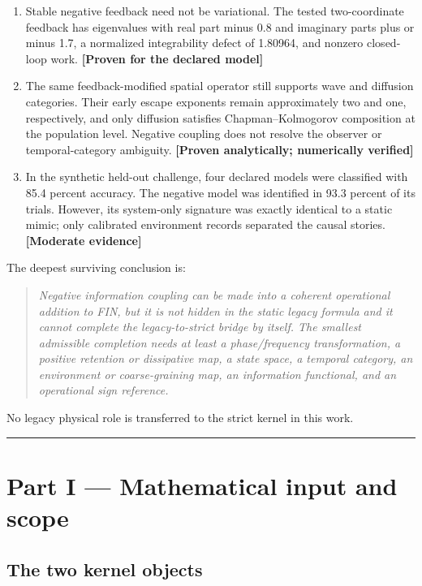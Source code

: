 \documentclass[11pt,a4paper,openany]{report}
\newcommand{\statusModerate}{\textcolor{finviolet}{[Moderate evidence]}}
\begin{document}
\begin{enumerate}
\item 
Stable negative feedback need not be variational. The tested two-coordinate feedback has eigenvalues with real part minus 0.8 and imaginary parts plus or minus 1.7, a normalized integrability defect of 1.80964, and nonzero closed-loop work. \textbf{[Proven for the declared model]}

\item 
The same feedback-modified spatial operator still supports wave and diffusion categories. Their early escape exponents remain approximately two and one, respectively, and only diffusion satisfies Chapman–Kolmogorov composition at the population level. Negative coupling does not resolve the observer or temporal-category ambiguity. \textbf{[Proven analytically; numerically verified]}

\item 
In the synthetic held-out challenge, four declared models were classified with 85.4 percent accuracy. The negative model was identified in 93.3 percent of its trials. However, its system-only signature was exactly identical to a static mimic; only calibrated environment records separated the causal stories. \textbf{\statusModerate{}}

\end{enumerate}

The deepest surviving conclusion is:

\begin{quote}\itshape
Negative information coupling can be made into a coherent operational addition to FIN, but it is not hidden in the static legacy formula and it cannot complete the legacy-to-strict bridge by itself. The smallest admissible completion needs at least a phase/\allowbreak{}frequency transformation, a positive retention or dissipative map, a state space, a temporal category, an environment or coarse-graining map, an information functional, and an operational sign reference.

\end{quote}

No legacy physical role is transferred to the strict kernel in this work.

\par\medskip\hrule\medskip

\chapter{Part I — Mathematical input and scope}

\section{The two kernel objects}
\end{document}
